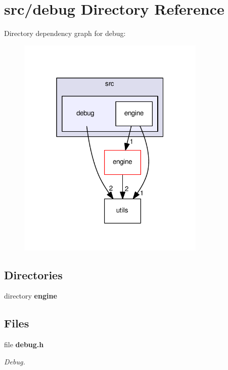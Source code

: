 \section{src/debug Directory Reference}
\label{dir_44d5bc2300862405dbe586a8cb303c4f}
Directory dependency graph for debug\+:
\nopagebreak
\begin{figure}[H]
\begin{center}
\leavevmode
\includegraphics[width=254pt]{dir_44d5bc2300862405dbe586a8cb303c4f_dep}
\end{center}
\end{figure}
\subsection*{Directories}
\begin{DoxyCompactItemize}
\item 
directory \textbf{ engine}
\end{DoxyCompactItemize}
\subsection*{Files}
\begin{DoxyCompactItemize}
\item 
file \textbf{ debug.\+h}
\begin{DoxyCompactList}\small\item\em Debug. \end{DoxyCompactList}\end{DoxyCompactItemize}
